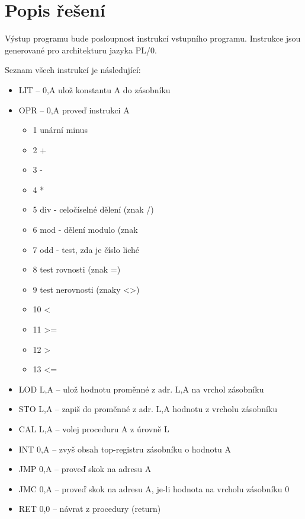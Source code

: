 \documentclass{style}
\begin{document}
\chapter{Popis řešení}
Výstup programu bude posloupnost instrukcí vstupního programu. Instrukce jsou generované pro architekturu jazyka PL/0.

Seznam všech instrukcí je následující:

\begin{itemize}
\item LIT --  0,A    ulož konstantu A do zásobníku \\
\item OPR -- 0,A    proveď instrukci A \\
\begin{itemize}
\item 1    unární minus \\
\item 2    + \\
\item 3    - \\
\item 4    * \\
\item 5    div - celočíselné dělení (znak /) \\
\item 6    mod - dělení modulo (znak %
\item 7    odd - test, zda je číslo liché \\
\item 8    test rovnosti (znak =) \\
\item 9    test nerovnosti (znaky <>) \\
\item 10    < \\
\item 11    >= \\
\item 12    > \\
\item 13    <= \\
\end{itemize}

\item LOD L,A --    ulož hodnotu proměnné z adr. L,A na vrchol zásobníku \\
\item STO L,A --    zapiš do proměnné z adr. L,A hodnotu z vrcholu zásobníku \\
\item CAL L,A  --  volej proceduru A z úrovně L \\
\item INT 0,A   -- zvyš obsah top-registru zásobníku o hodnotu A \\
\item JMP 0,A   -- proveď skok na adresu A \\
\item JMC 0,A   -- proveď skok na adresu A, je-li hodnota na vrcholu zásobníku 0 \\
\item RET 0,0  --  návrat z procedury (return) \\


\end{itemize}
\end{document}
